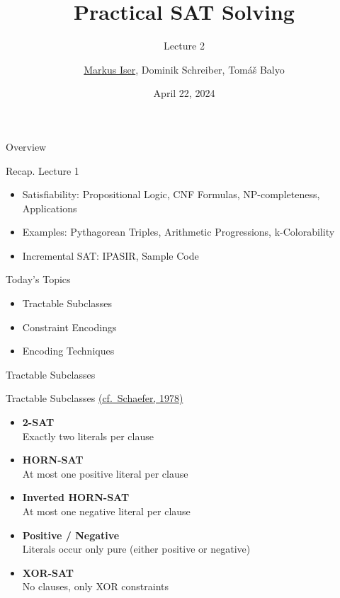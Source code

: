 \documentclass[t]{sdqbeamer}
\title[SAT Solving]{Practical SAT Solving}
\subtitle{Lecture 2}
\author{\underline{Markus Iser}, Dominik Schreiber, Tom\'a\v{s} Balyo}
\date{April 22, 2024}
\begin{document}
\begin{frame}
	\thispagestyle{empty}
	\titlepage
\end{frame}

\begin{frame}{Overview}
	\begin{block}{Recap. Lecture 1}
		\begin{itemize}\setlength{\itemsep}{1em}
			\item Satisfiability: Propositional Logic, CNF Formulas, NP-completeness, Applications
			\item Examples: Pythagorean Triples, Arithmetic Progressions, k-Colorability
			\item Incremental SAT: IPASIR, Sample Code
		\end{itemize}
	\end{block}
	\begin{block}{Today's Topics}
		\begin{itemize}\setlength{\itemsep}{1em}
			\item Tractable Subclasses
			\item Constraint Encodings
			\item Encoding Techniques
		\end{itemize}
	\end{block}
\end{frame}

\begin{frame}{Tractable Subclasses}
\begin{block}{Tractable Subclasses \href{https://doi.org/10.1145/800133.804350}{(cf.~Schaefer, 1978)}}
	\begin{itemize}\setlength{\itemsep}{1em}
		\item \textbf{2-SAT}\\Exactly two literals per clause
		\item \textbf{HORN-SAT}\\At most one positive literal per clause
		\item \textbf{Inverted HORN-SAT}\\At most one negative literal per clause
		\item \textbf{Positive / Negative}\\Literals occur only pure (either positive or negative)
		\item \textbf{XOR-SAT}\\No clauses, only XOR constraints
	\end{itemize}
\end{block}
\end{frame}
\end{document}
